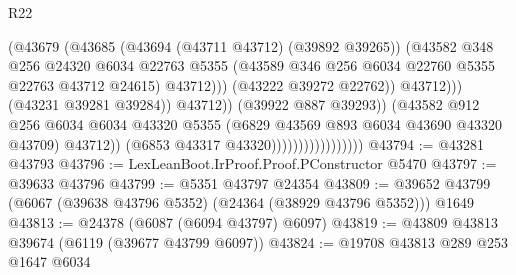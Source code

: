 \begin{lexlean}{R22}
\begin{coremodule}
                                                      (@43679
                                                        (@43685
                                                          (@43694 (@43711 @43712) (@39892 @39265))
                                                          (@43582
                                                            @348
                                                            @256
                                                            @24320
                                                            @6034
                                                            @22763
                                                            @5355
                                                            (@43589
                                                              @346
                                                              @256
                                                              @6034
                                                              @22760
                                                              @5355
                                                              @22763
                                                              @43712
                                                              @24615)
                                                            @43712)))
                                                      (@43222 @39272 @22762))
                                                    @43712)))
                                              (@43231 @39281 @39284))
                                            @43712))
                                        (@39922 @887 @39293))
                                      (@43582
                                        @912
                                        @256
                                        @6034
                                        @6034
                                        @43320
                                        @5355
                                        (@6829 @43569 @893 @6034 @43690 @43320 @43709)
                                        @43712))
                                    (@6853 @43317 @43320)))))))))))))))))
@43794 := @43281 @43793
@43796 := LexLeanBoot.IrProof.Proof.PConstructor @5470
@43797 := @39633 @43796
@43799 := @5351 @43797 @24354
@43809 := @39652 @43799 (@6067 (@39638 @43796 @5352) (@24364 (@38929 @43796 @5352))) @1649
@43813 := @24378 (@6087 (@6094 @43797) @6097)
@43819 := @43809 @43813 @39674 (@6119 (@39677 @43799 @6097))
@43824 := @19708 @43813 @289 @253 @1647 @6034

\end{coremodule}
\end{lexlean}
